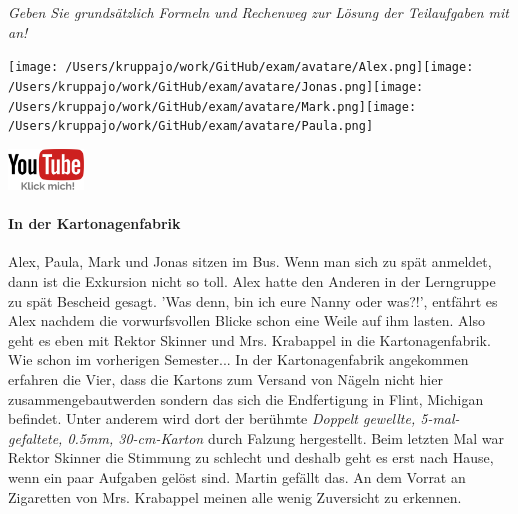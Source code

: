 \documentclass[a4paper, 9pt]{scrartcl}\usepackage[]{graphicx}\usepackage[]{xcolor}
\begin{document}
\textit{Geben Sie grundsätzlich Formeln und Rechenweg zur Lösung der Teilaufgaben mit an!} \\[1Ex]
 

 
\begin{minipage}[t]{0.5\textwidth}
\texttt{[image: /Users/kruppajo/work/GitHub/exam/avatare/Alex.png]}\hspace{-4mm}\texttt{[image: /Users/kruppajo/work/GitHub/exam/avatare/Jonas.png]}\hspace{-4mm}\texttt{[image: /Users/kruppajo/work/GitHub/exam/avatare/Mark.png]}\hspace{-4mm}\texttt{[image: /Users/kruppajo/work/GitHub/exam/avatare/Paula.png]}
\end{minipage}
\begin{minipage}[t]{0.5\textwidth}
\hfill
\href{https://youtu.be/RuzMjwvwT-4}{\includegraphics[width = 2cm]{img/youtube}}
\end{minipage}




\paragraph{In der Kartonagenfabrik}



Alex, Paula, Mark und Jonas sitzen im Bus. Wenn man sich zu spät anmeldet, dann ist die Exkursion nicht so toll. Alex hatte den Anderen in der Lerngruppe zu spät Bescheid gesagt. 'Was denn, bin ich eure Nanny oder was?!', entfährt es Alex nachdem die vorwurfsvollen Blicke schon eine Weile auf ihm lasten. Also geht es eben mit Rektor Skinner und Mrs. Krabappel in die Kartonagenfabrik. Wie schon im vorherigen Semester... In der Kartonagenfabrik angekommen erfahren die Vier, dass die Kartons zum Versand von Nägeln nicht hier zusammengebautwerden sondern das sich die Endfertigung in Flint, Michigan befindet. Unter anderem wird dort der berühmte \textit{Doppelt gewellte, 5-mal-gefaltete, 0.5mm, 30-cm-Karton} durch
Falzung hergestellt. Beim letzten Mal war Rektor Skinner die Stimmung zu schlecht und deshalb geht es erst nach Hause, wenn ein paar Aufgaben gelöst sind. Martin gefällt das. An dem Vorrat an Zigaretten von Mrs. Krabappel meinen alle wenig Zuversicht zu erkennen.\\
\end{document}
